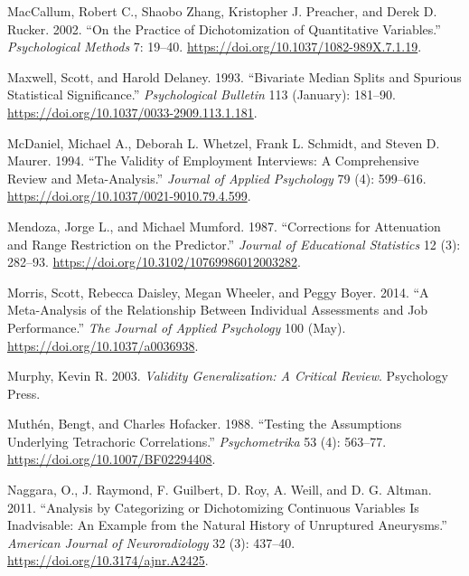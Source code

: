 \documentclass[
  letterpaper,
  DIV=11,
  numbers=noendperiod]{scrreprt}
\newlength{\cslhangindent}
\newlength{\cslentryspacingunit} %
\newenvironment{CSLReferences}[2] %
 {%
  \setlength{\parindent}{0pt}
  \ifodd #1
  \let\oldpar\par
  \def\par{\hangindent=\cslhangindent\oldpar}
  \fi
  \setlength{\parskip}{#2\cslentryspacingunit}
 }%
 {}
\begin{document}
\begin{CSLReferences}{1}{0}
\leavevmode{}%
MacCallum, Robert C., Shaobo Zhang, Kristopher J. Preacher, and Derek D.
Rucker. 2002. {``On the Practice of Dichotomization of Quantitative
Variables.''} \emph{Psychological Methods} 7: 19--40.
\url{https://doi.org/10.1037/1082-989X.7.1.19}.

\leavevmode{}%
Maxwell, Scott, and Harold Delaney. 1993. {``Bivariate Median Splits and
Spurious Statistical Significance.''} \emph{Psychological Bulletin} 113
(January): 181--90. \url{https://doi.org/10.1037/0033-2909.113.1.181}.

\leavevmode{}%
McDaniel, Michael A., Deborah L. Whetzel, Frank L. Schmidt, and Steven
D. Maurer. 1994. {``The Validity of Employment Interviews: A
Comprehensive Review and Meta-Analysis.''} \emph{Journal of Applied
Psychology} 79 (4): 599--616.
\url{https://doi.org/10.1037/0021-9010.79.4.599}.

\leavevmode{}%
Mendoza, Jorge L., and Michael Mumford. 1987. {``Corrections for
Attenuation and Range Restriction on the Predictor.''} \emph{Journal of
Educational Statistics} 12 (3): 282--93.
\url{https://doi.org/10.3102/10769986012003282}.

\leavevmode{}%
Morris, Scott, Rebecca Daisley, Megan Wheeler, and Peggy Boyer. 2014.
{``A Meta-Analysis of the Relationship Between Individual Assessments
and Job Performance.''} \emph{The Journal of Applied Psychology} 100
(May). \url{https://doi.org/10.1037/a0036938}.

\leavevmode{}%
Murphy, Kevin R. 2003. \emph{Validity Generalization: A Critical
Review}. Psychology Press.

\leavevmode{}%
Muthén, Bengt, and Charles Hofacker. 1988. {``Testing the Assumptions
Underlying Tetrachoric Correlations.''} \emph{Psychometrika} 53 (4):
563--77. \url{https://doi.org/10.1007/BF02294408}.

\leavevmode{}%
Naggara, O., J. Raymond, F. Guilbert, D. Roy, A. Weill, and D. G.
Altman. 2011. {``Analysis by Categorizing or Dichotomizing Continuous
Variables Is Inadvisable: An Example from the Natural History of
Unruptured Aneurysms.''} \emph{American Journal of Neuroradiology} 32
(3): 437--40. \url{https://doi.org/10.3174/ajnr.A2425}.


\end{CSLReferences}
\end{document}
